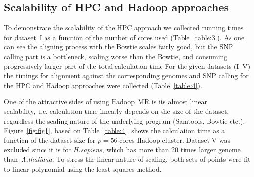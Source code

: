 \documentclass[11pt, oneside]{article}   	%
\begin{document}
\subsection{Scalability of HPC and Hadoop approaches}
To demonstrate the scalability of  the HPC approach we collected running times for dataset~I as a function of the number of cores used (Table~\ref{table:3}).
As one can see the aligning process with the Bowtie scales fairly good, but the SNP calling part is a bottleneck,  scaling worse than the Bowtie, and consuming progressively larger part of the total calculation time
For the given datasets (I--V) the timings for alignment against the corresponding genomes and SNP calling for  the HPC and Hadoop approaches were collected (Table~\ref{table:4}).

One of the attractive sides of using Hadoop~MR is its almost linear scalability,~i.e. calculation time linearly depends on the size of the dataset\cite{crossbow,seal}, regardless the scaling nature of the underlying program (Samtools, Bowtie etc.). 
Figure~\ref{fig:fig1}, based on Table~\ref{table:4}, shows the calculation time as a function of the dataset size for $p=56$ cores Hadoop cluster. Dataset V was excluded since it is for {\it H.sapiens}, which has more than 20 times larger genome than~{\it A.thaliana}.
To stress the linear nature of scaling, both sets of points were fit to linear polynomial using the least squares method.
\end{document}

